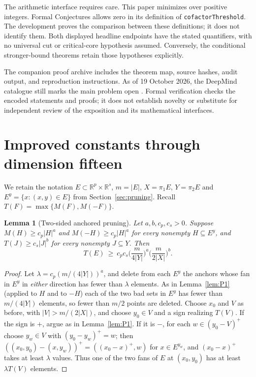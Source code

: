 \documentclass[11pt]{amsart}
\newtheorem{lemma}[theorem]{Lemma}
\theoremstyle{definition}
\theoremstyle{remark}
\newcommand{\R}{\mathbb{R}}
\newcommand{\Mf}{M}
\newcommand{\Tf}{T}
\begin{document}
The arithmetic interface requires care. This paper minimizes over positive integers. Formal Conjectures allows zero in its definition of \texttt{cofactorThreshold}. The development proves the comparison between these definitions; it does not identify them. Both displayed headline endpoints have the stated quantifiers, with no universal cut or critical-core hypothesis assumed. Conversely, the conditional stronger-bound theorems retain those hypotheses explicitly.

The companion proof archive includes the theorem map, source hashes, audit output, and reproduction instructions. As of 19 October 2026, the DeepMind catalogue still marks the main problem open \cite{FC539}. Formal verification checks the encoded statements and proofs; it does not establish novelty or substitute for independent review of the exposition and its mathematical interfaces.

\appendix
\section{Improved constants through dimension fifteen}\label{app:small-d}
We retain the notation $E\subset\R^p\times\R^s$, $m=|E|$, $X=\pi_1E$, $Y=\pi_2E$ and $E^y=\{x:(x,y)\in E\}$ from Section~\ref{sec:pruning}. Recall $T(F)=\max\{M(F),M(-F)\}$.

\begin{lemma}[Two-sided anchored pruning]\label{lem:P2}
Let $a,b,c_p,c_s>0$. Suppose $\Mf(H)\ge c_p|H|^a$ and $\Mf(-H)\ge c_p|H|^a$ for every nonempty $H\subseteq E^y$, and $\Tf(J)\ge c_s|J|^b$ for every nonempty $J\subseteq Y$. Then
\[
\Tf(E)\ \ge\ c_pc_s\Big(\frac{m}{4|Y|}\Big)^{a}\Big(\frac{m}{2|X|}\Big)^{b}.
\]
\end{lemma}

\begin{proof}
Let $\lambda=c_p(m/(4|Y|))^a$, and delete from each $E^y$ the anchors whose fan in $E^y$ in \emph{either} direction has fewer than $\lambda$ elements. As in Lemma~\ref{lem:P1} (applied to $H$ and to $-H$) each of the two bad sets in $E^y$ has fewer than $m/(4|Y|)$ elements, so fewer than $m/2$ points are deleted. Choose $x_0$ and $V$ as before, with $|V|>m/(2|X|)$, and choose $y_0\in V$ and a sign realizing $\Tf(V)$. If the sign is $+$, argue as in Lemma~\ref{lem:P1}. If it is $-$, for each $w\in(y_0-V)^+$ choose $y_w\in V$ with $(y_0-y_w)^+=w$; then $((x_0,y_0)-(x,y_w))^+=((x_0-x)^+,w)$ for $x\in E^{y_w}$, and $(x_0-x)^+$ takes at least $\lambda$ values. Thus one of the two fans of $E$ at $(x_0,y_0)$ has at least $\lambda\Tf(V)$ elements.
\end{proof}
\end{document}
